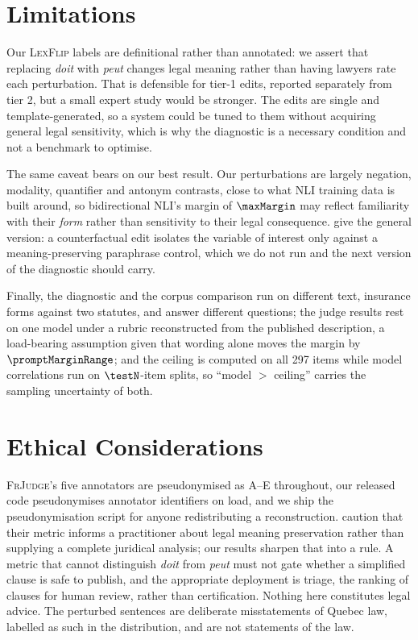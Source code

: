\documentclass[11pt]{article}
\begin{document}
\section*{Limitations}
\label{sec:limits}

Our \textsc{LexFlip} labels are definitional rather than annotated: we assert
that replacing \emph{doit} with \emph{peut} changes legal meaning rather than
having lawyers rate each perturbation. That is defensible for tier-1 edits, reported
separately from tier 2, but a small expert study would be stronger. The edits
are single and template-generated, so a system could be tuned to them without
acquiring general legal sensitivity, which is why the diagnostic is a necessary
condition and not a benchmark to optimise.

The same caveat bears on our best result. Our perturbations are largely
negation, modality, quantifier and antonym contrasts, close to what NLI
training data is built around, so bidirectional NLI's margin of $\maxMargin$ may
reflect familiarity with their \emph{form} rather than sensitivity to their
legal consequence. \citet{yang2026compared} give the general version: a
counterfactual edit isolates the variable of interest only against a
meaning-preserving paraphrase control, which we do not run and the next version
of the diagnostic should carry.

Finally, the diagnostic and the corpus comparison run on different text,
insurance forms against two statutes, and answer different questions; the judge
results rest on one model under a rubric reconstructed from the published
description, a load-bearing assumption given that wording alone moves the margin
by $\promptMarginRange$; and the ceiling is computed on all 297 items while model
correlations run on $\testN$-item splits, so ``model $>$ ceiling'' carries the
sampling uncertainty of both.

\section*{Ethical Considerations}
\label{sec:ethics}

\textsc{FrJudge}'s five annotators are pseudonymised as A--E throughout, our
released code pseudonymises annotator identifiers on load, and we ship the
pseudonymisation script for anyone redistributing a reconstruction.
\citet{beauchemin2025judgebert} caution that their metric informs a practitioner
about legal meaning preservation rather than supplying a complete juridical
analysis; our results sharpen that into a rule. A metric that cannot distinguish
\emph{doit} from \emph{peut} must not gate whether a simplified clause is safe
to publish, and the appropriate deployment is triage, the ranking of clauses for
human review, rather than certification. Nothing here constitutes legal advice.
The perturbed sentences are deliberate misstatements of Quebec law, labelled as
such in the distribution, and are not statements of the law.
\end{document}
